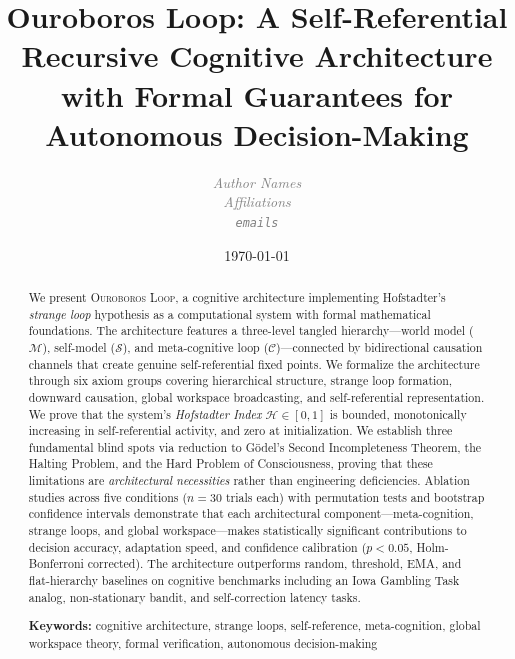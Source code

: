 \documentclass[11pt,a4paper]{article}
\newcommand{\OL}{\textsc{Ouroboros Loop}}
\newcommand{\HI}{\mathcal{H}}  %
\newcommand{\SM}{\mathcal{S}}  %
\newcommand{\WM}{\mathcal{M}}  %
\newcommand{\MC}{\mathcal{C}}  %
\newcommand{\placeholder}[1]{\textcolor{gray}{\textit{#1}}}
\begin{document}
\title{%
  Ouroboros Loop: A Self-Referential Recursive Cognitive Architecture\\
  with Formal Guarantees for Autonomous Decision-Making
}

\author{
  \placeholder{Author Names}\\
  \placeholder{Affiliations}\\
  \texttt{\placeholder{emails}}
}

\date{\today}

\maketitle

\begin{abstract}
We present \OL{}, a cognitive architecture implementing Hofstadter's
\emph{strange loop} hypothesis as a computational system with formal
mathematical foundations. The architecture features a three-level tangled
hierarchy---world model ($\WM$), self-model ($\SM$), and meta-cognitive
loop ($\MC$)---connected by bidirectional causation channels that create
genuine self-referential fixed points. We formalize the architecture
through six axiom groups covering hierarchical structure, strange loop
formation, downward causation, global workspace broadcasting, and
self-referential representation. We prove that the system's
\emph{Hofstadter Index} $\HI \in [0,1]$ is bounded, monotonically
increasing in self-referential activity, and zero at initialization.
We establish three fundamental blind spots via reduction to G\"odel's
Second Incompleteness Theorem, the Halting Problem, and the Hard Problem
of Consciousness, proving that these limitations are \emph{architectural
necessities} rather than engineering deficiencies. Ablation studies
across five conditions ($n=30$ trials each) with permutation tests and
bootstrap confidence intervals demonstrate that each architectural
component---meta-cognition, strange loops, and global workspace---makes
statistically significant contributions to decision accuracy, adaptation
speed, and confidence calibration ($p < 0.05$, Holm-Bonferroni corrected).
The architecture outperforms random, threshold, EMA, and flat-hierarchy
baselines on cognitive benchmarks including an Iowa Gambling Task analog,
non-stationary bandit, and self-correction latency tasks.

\medskip
\noindent\textbf{Keywords:} cognitive architecture, strange loops,
self-reference, meta-cognition, global workspace theory, formal
verification, autonomous decision-making
\end{abstract}
\end{document}
